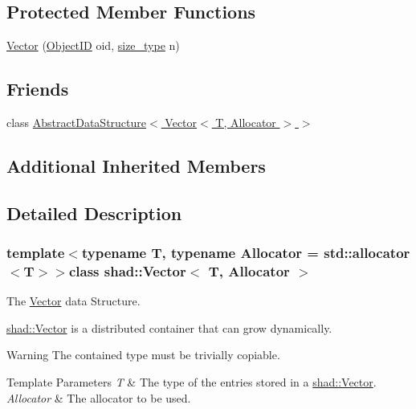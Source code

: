 \subsection*{Protected Member Functions}
\begin{DoxyCompactItemize}
\item 
\hyperlink{classshad_1_1Vector_a19cf7c81eea1bbf2f1f3222ac6b4a4a5}{Vector} (\hyperlink{classshad_1_1Vector_a71193856f7dddb5e9fe0128fe5d12448}{Object\-I\-D} oid, \hyperlink{classshad_1_1Vector_a1c97f4eb87d738cb4de97e5b3587c397}{size\-\_\-type} n)
\end{DoxyCompactItemize}
\subsection*{Friends}
\begin{DoxyCompactItemize}
\item 
class \hyperlink{classshad_1_1Vector_ac9d0ae866fc73cd8c7637ff2691c13bb}{Abstract\-Data\-Structure$<$ Vector$<$ T, Allocator $>$ $>$}
\end{DoxyCompactItemize}
\subsection*{Additional Inherited Members}


\subsection{Detailed Description}
\subsubsection*{template$<$typename T, typename Allocator = std\-::allocator$<$\-T$>$$>$class shad\-::\-Vector$<$ T, Allocator $>$}

The \hyperlink{classshad_1_1Vector}{Vector} data Structure. 

\hyperlink{classshad_1_1Vector}{shad\-::\-Vector} is a distributed container that can grow dynamically.

\begin{DoxyWarning}{Warning}
The contained type must be trivially copiable.
\end{DoxyWarning}

\begin{DoxyTemplParams}{Template Parameters}
{\em T} & The type of the entries stored in a \hyperlink{classshad_1_1Vector}{shad\-::\-Vector}. \\
\hline
{\em Allocator} & The allocator to be used. \\
\hline
\end{DoxyTemplParams}


